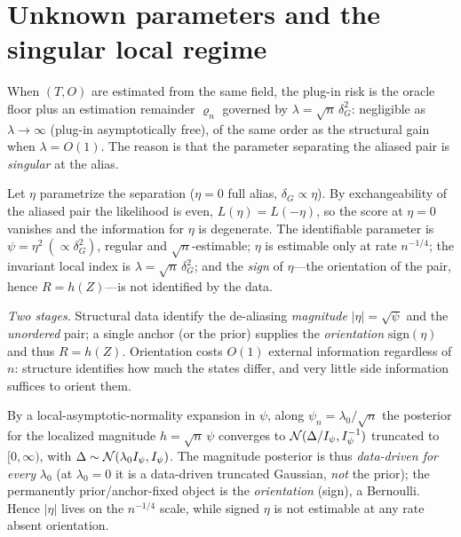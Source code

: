 \documentclass[11pt]{article}
\theoremstyle{plain}
\theoremstyle{definition}\newtheorem{definition}{Definition}\newtheorem{assumption}{Assumption}
\begin{document}
\section{Unknown parameters and the singular local regime}\label{sec:singular}
When $(T,O)$ are estimated from the same field, the plug-in risk is the oracle floor plus an estimation remainder
$\varrho_n$ governed by $\lambda=\sqrt n\,\delta_G^2$: negligible as $\lambda\to\infty$ (plug-in asymptotically
free), of the same order as the structural gain when $\lambda=O(1)$. The reason is that the parameter separating
the aliased pair is \emph{singular} at the alias.
\begin{proposition}\label{prop:singular}
Let $\eta$ parametrize the separation ($\eta=0$ full alias, $\delta_G\propto\eta$). By exchangeability of the
aliased pair the likelihood is even, $L(\eta)=L(-\eta)$, so the score at $\eta=0$ vanishes and the information for
$\eta$ is degenerate. The identifiable parameter is $\psi=\eta^2\ (\propto\delta_G^2)$, regular and
$\sqrt n$-estimable; $\eta$ is estimable only at rate $n^{-1/4}$; the invariant local index is
$\lambda=\sqrt n\,\delta_G^2$; and the \emph{sign} of $\eta$---the orientation of the pair, hence $R=h(Z)$---is
not identified by the data.
\end{proposition}
\noindent \emph{Two stages.} Structural data identify the de-aliasing \emph{magnitude} $|\eta|=\sqrt\psi$ and the
\emph{unordered} pair; a single anchor (or the prior) supplies the \emph{orientation} $\mathrm{sign}(\eta)$ and
thus $R=h(Z)$. Orientation costs $O(1)$ external information regardless of $n$: structure identifies how much the
states differ, and very little side information suffices to orient them.
\begin{proposition}\label{prop:boundary}
By a local-asymptotic-normality expansion in $\psi$, along $\psi_n=\lambda_0/\sqrt n$ the posterior for the
localized magnitude $h=\sqrt n\,\psi$ converges to $\mathcal{N}(\Delta/I_\psi,I_\psi^{-1})$ truncated to $[0,\infty)$, with
$\Delta\sim\mathcal{N}(\lambda_0 I_\psi,I_\psi)$. The magnitude posterior is thus \emph{data-driven for every} $\lambda_0$
(at $\lambda_0=0$ it is a data-driven truncated Gaussian, \emph{not} the prior); the permanently prior/anchor-fixed
object is the \emph{orientation} (sign), a Bernoulli. Hence $|\eta|$ lives on the $n^{-1/4}$ scale, while signed
$\eta$ is not estimable at any rate absent orientation.
\end{proposition}
\end{document}
